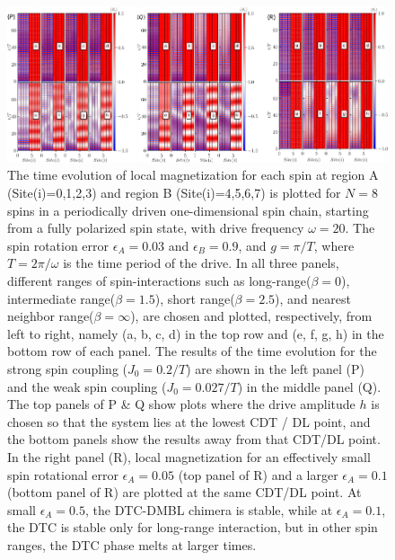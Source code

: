 \documentclass[12pt]{iopart}
\begin{document}
\begin{figure}[t!]
    \centering
    \includegraphics[width=16cm]{sz_t_strongweakJ_ea_N_8.pdf}
    \caption{The time evolution of local magnetization for each spin at region A (Site(i)=0,1,2,3) and region B (Site(i)=4,5,6,7) is plotted for $N=8$ spins in a periodically driven one-dimensional spin chain, starting from a fully polarized spin state, with drive frequency $\omega=20$. The spin rotation error $\epsilon_A = 0.03$ and $\epsilon_B = 0.9$, and $g=\pi/T$, where $T=2\pi/\omega$ is the time period of the drive.  In all three panels, different ranges of spin-interactions such as long-range($\beta=0$), intermediate range($\beta=1.5$), short range($\beta=2.5$), and nearest neighbor range($\beta=\infty$), are chosen and plotted, respectively, from left to right, namely (a, b, c, d) in the top row and (e, f, g, h) in the bottom row of each panel. The results of the time evolution for the strong spin coupling ($J_0 = 0.2/T$) are shown in the left panel (P) and the weak spin coupling ($J_0 = 0.027/T$) in the middle panel (Q). The top panels of P \& Q show plots where the drive amplitude $h$ is chosen so that the system lies at the lowest CDT / DL point, and the bottom panels show the results away from that CDT/DL point. In the right panel (R), local magnetization for an effectively small spin rotational error $\epsilon_A = 0.05$ (top panel of R) and a larger $\epsilon_A = 0.1$ (bottom panel of R) are plotted at the same CDT/DL point. At small $\epsilon_A=0.5$, the DTC-DMBL chimera is stable, while at $\epsilon_A=0.1$, the DTC is stable only for long-range interaction, but in other spin ranges, the DTC phase melts at larger times.}
    \label{Fig:strong_weak_ea}
\end{figure}
\end{document}
